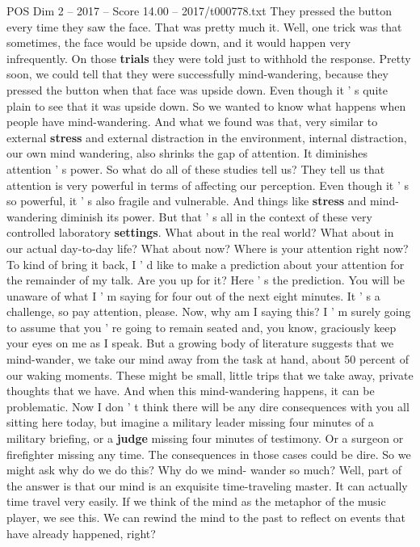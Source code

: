 \begin{textsample}{POS Dim 2 – 2017 – Score 14.00 – 2017/t000778.txt}
They pressed the button every time they saw the face.
That was pretty much it.
Well, one trick was that sometimes, the face would be upside down, and it would happen very infrequently.
On those \textbf{trials} they were told just to withhold the response.
Pretty soon, we could tell that they were successfully mind-wandering, because they pressed the button when that face was upside down.
Even though it ' s quite plain to see that it was upside down.
So we wanted to know what happens when people have mind-wandering.
And what we found was that, very similar to external \textbf{stress} and external distraction in the environment, internal distraction, our own mind wandering, also shrinks the gap of attention.
It diminishes attention ' s power.
So what do all of these studies tell us?
They tell us that attention is very powerful in terms of affecting our perception.
Even though it ' s so powerful, it ' s also fragile and vulnerable.
And things like \textbf{stress} and mind-wandering diminish its power.
But that ' s all in the context of these very controlled laboratory \textbf{settings}.
What about in the real world?
What about in our actual day-to-day life?
What about now?
Where is your attention right now?
To kind of bring it back, I ' d like to make a prediction about your attention for the remainder of my talk.
Are you up for it?
Here ' s the prediction.
You will be unaware of what I ' m saying for four out of the next eight minutes.
It ' s a challenge, so pay attention, please.
Now, why am I saying this?
I ' m surely going to assume that you ' re going to remain seated and, you know, graciously keep your eyes on me as I speak.
But a growing body of literature suggests that we mind-wander, we take our mind away from the task at hand, about 50 percent of our waking moments.
These might be small, little trips that we take away, private thoughts that we have.
And when this mind-wandering happens, it can be problematic.
Now I don ' t think there will be any dire consequences with you all sitting here today, but imagine a military leader missing four minutes of a military briefing, or a \textbf{judge} missing four minutes of testimony.
Or a surgeon or firefighter missing any time.
The consequences in those cases could be dire.
So we might ask why do we do this?
Why do we mind- wander so much?
Well, part of the answer is that our mind is an exquisite time-traveling master.
It can actually time travel very easily.
If we think of the mind as the metaphor of the music player, we see this.
We can rewind the mind to the past to reflect on events that have already happened, right?

\end{textsample}
